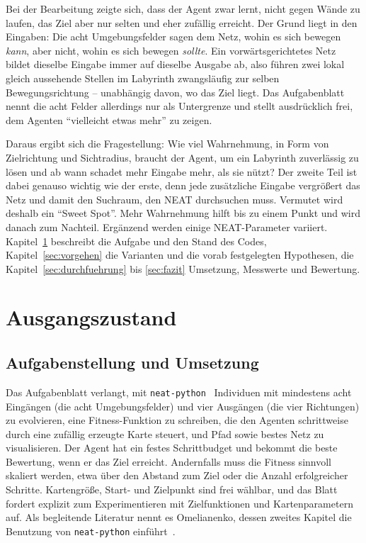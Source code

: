 \documentclass[sigconf]{acmart}
\begin{document}
Bei der Bearbeitung zeigte sich, dass der Agent zwar lernt, nicht gegen Wände zu laufen, das Ziel aber nur selten und eher zufällig erreicht. Der Grund liegt in den Eingaben: Die acht Umgebungsfelder sagen dem Netz, wohin es sich bewegen \emph{kann}, aber nicht, wohin es sich bewegen \emph{sollte}. Ein vorwärtsgerichtetes Netz bildet dieselbe Eingabe immer auf dieselbe Ausgabe ab, also führen zwei lokal gleich aussehende Stellen im Labyrinth zwangsläufig zur selben Bewegungsrichtung -- unabhängig davon, wo das Ziel liegt. Das Aufgabenblatt~\cite{lins2026lab03} nennt die acht Felder allerdings nur als Untergrenze und stellt ausdrücklich frei, dem Agenten \enquote{vielleicht etwas mehr} zu zeigen.

Daraus ergibt sich die Fragestellung: Wie viel Wahrnehmung, in Form von Zielrichtung und Sichtradius, braucht der Agent, um ein Labyrinth zuverlässig zu lösen und ab wann schadet mehr Eingabe mehr, als sie nützt? Der zweite Teil ist dabei genauso wichtig wie der erste, denn jede zusätzliche Eingabe vergrößert das Netz und damit den Suchraum, den NEAT durchsuchen muss. Vermutet wird deshalb ein \enquote{Sweet Spot}. Mehr Wahrnehmung hilft bis zu einem Punkt und wird danach zum Nachteil. Ergänzend werden einige NEAT-Parameter variiert. Kapitel~\ref{sec:ausgangszustand} beschreibt die Aufgabe und den Stand des Codes, Kapitel~\ref{sec:vorgehen} die Varianten und die vorab festgelegten Hypothesen, die Kapitel~\ref{sec:durchfuehrung} bis \ref{sec:fazit} Umsetzung, Messwerte und Bewertung.

\section{Ausgangszustand}
\label{sec:ausgangszustand}

\subsection{Aufgabenstellung und Umsetzung}
Das Aufgabenblatt verlangt, mit \texttt{neat-python}~\cite{neatpython} Individuen mit mindestens acht Eingängen (die acht Umgebungsfelder) und vier Ausgängen (die vier Richtungen) zu evolvieren, eine Fitness-Funktion zu schreiben, die den Agenten schrittweise durch eine zufällig erzeugte Karte steuert, und Pfad sowie bestes Netz zu visualisieren. Der Agent hat ein festes Schrittbudget und bekommt die beste Bewertung, wenn er das Ziel erreicht. Andernfalls muss die Fitness sinnvoll skaliert werden, etwa über den Abstand zum Ziel oder die Anzahl erfolgreicher Schritte. Kartengröße, Start- und Zielpunkt sind frei wählbar, und das Blatt fordert explizit zum Experimentieren mit Zielfunktionen und Kartenparametern auf. Als begleitende Literatur nennt es Omelianenko, dessen zweites Kapitel die Benutzung von \texttt{neat-python} einführt~\cite[S.~39]{omelianenko2019}.
\end{document}
